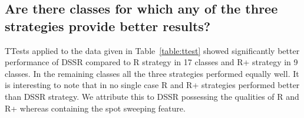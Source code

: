 \documentclass[conference]{IEEEtran}
\begin{document}
\subsection{Are there classes for which any of the three strategies provide better results?}


\noindent TTests applied to the data given in Table~\ref{table:ttest} showed significantly better performance of DSSR compared to R strategy in 17 classes and R+ strategy in 9 classes. In the remaining classes all the three strategies performed equally well. It is interesting to note that in no single case R and R+ strategies performed better than DSSR strategy. We attribute this to DSSR possessing the qualities of R and R+ whereas containing the spot sweeping feature.
\end{document}
